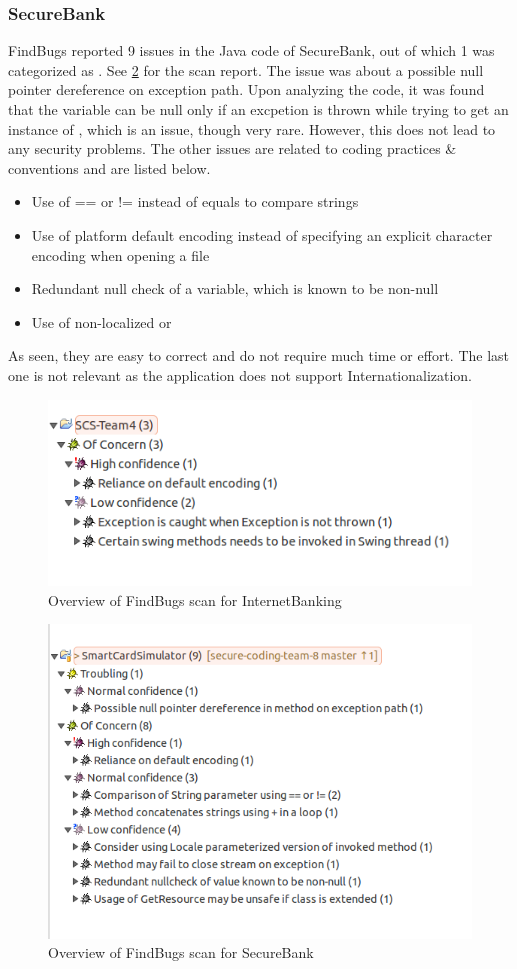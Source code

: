 \subsubsection{SecureBank}
FindBugs reported 9 issues in the Java code of SecureBank, out of which 1 was categorized as . See \ref{fig:findbugs_overview_secure_bank} for the scan report.
The issue was about a possible null pointer dereference on exception path. Upon analyzing the code, it was found that the variable can be null only if an excpetion is thrown while trying to get an instance of , which is an issue, though very rare. However, this does not lead to any security problems.
The other issues are related to coding practices \& conventions and are listed below.
\begin{itemize}
	\item Use of == or != instead of equals to compare strings
	\item Use of platform default encoding instead of specifying an explicit character encoding when opening a file
	\item Redundant null check of a variable, which is known to be non-null
	\item Use of non-localized  or 
\end{itemize}
As seen, they are easy to correct and do not require much time or effort. The last one is not relevant as the application does not support Internationalization.

\begin{figure}[ht]
	\centering
	\includegraphics[width=.6\linewidth]{figures/findbugs_overview.png}
	\caption{Overview of FindBugs scan for InternetBanking}
	\label{fig:findbugs_overview}
\end{figure}

\begin{figure}[ht]
	\centering
	\includegraphics[width=.6\linewidth]{figures/findbugs_overview_secure_bank.png}
	\caption{Overview of FindBugs scan for SecureBank}
	\label{fig:findbugs_overview_secure_bank}
\end{figure}